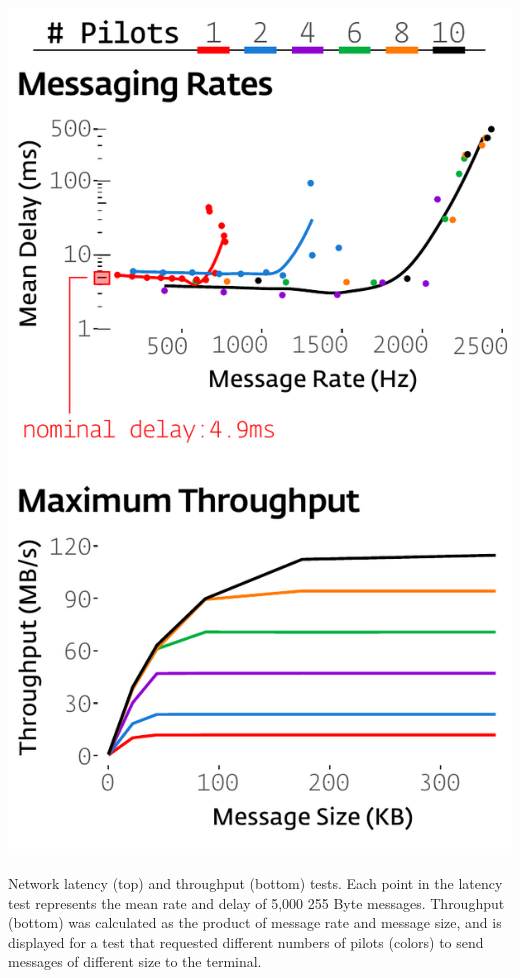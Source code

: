 \documentclass[nohyper, justified, notitlepage, marginals=raggedright,twoside=false,debug]{tufte-autopilot}
\begin{document}
\begin{marginfigure}[-0.4cm]
\includegraphics[]{figures/test_net_combined.pdf}

\caption{Network latency (top) and throughput (bottom) tests. Each point in the latency test represents the mean rate and delay of 5,000 255 Byte messages. Throughput (bottom) was calculated as the product of message rate and message size, and is displayed for a test that requested different numbers of pilots (colors) to send messages of different size to the terminal.}
\label{fig:speed}
\end{marginfigure}
\end{document}
